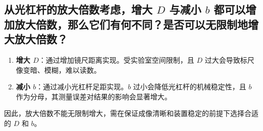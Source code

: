 \documentclass[]{../template/Report}%
\begin{document}
\begin{fullreportonly}
\subsection{从光杠杆的放大倍数考虑，增大 $D$ 与减小 $b$ 都可以增加放大倍数，那么它们有何不同？是否可以无限制地增大放大倍数？}
\begin{enumerate}
    \item \textbf{增大 $D$}：通过增加镜尺距离实现。受实验室空间限制，且 $D$ 过大会导致标尺像变暗、模糊，难以读数。
    \item \textbf{减小 $b$}：通过减小光杠杆足距实现。$b$ 过小会降低光杠杆的机械稳定性，且 $b$ 作为分母，其测量误差对结果的影响会显著增大。
\end{enumerate}
因此，放大倍数不能无限制增大，需在保证成像清晰和装置稳定的前提下选择合适的 $D$ 和 $b$。
\end{fullreportonly}
\insertnotes
\end{document}
